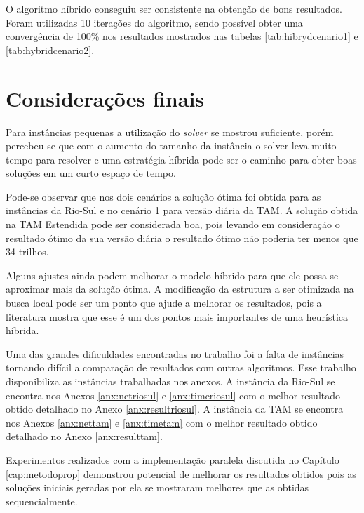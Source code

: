 O algoritmo híbrido conseguiu ser consistente na obtenção de bons resultados.
Foram utilizadas 10 iterações do algoritmo, sendo possível obter uma
convergência de 100\% nos resultados mostrados nas tabelas \ref{tab:hibrydcenario1} e
\ref{tab:hybridcenario2}. 

\section{Considerações finais} \label{result:finalizacao}





Para instâncias pequenas a utilização do \textit{solver} se mostrou suficiente,
porém percebeu-se que com o aumento do tamanho da instância o solver leva muito
tempo para resolver e uma estratégia híbrida pode ser o caminho para obter boas
soluções em um curto espaço de tempo.

Pode-se observar que nos dois cenários a solução ótima foi obtida para as
instâncias da Rio-Sul e no cenário 1 para versão diária da TAM. A solução obtida
na TAM Estendida pode ser considerada boa, pois levando em consideração o resultado
ótimo da sua versão diária o resultado ótimo não poderia ter menos que 34
trilhos.
  
Alguns ajustes ainda podem melhorar o modelo híbrido para que ele possa se
aproximar mais da solução ótima. A modificação da estrutura a ser otimizada na
busca local pode ser um ponto que ajude a melhorar os resultados, pois a
literatura mostra que esse é um dos pontos mais importantes de uma heurística
híbrida.
 
Uma das grandes dificuldades encontradas no trabalho foi a falta de instâncias
tornando difícil a comparação de resultados com outras algoritmos. Esse trabalho
disponibiliza as instâncias trabalhadas nos anexos. A instância da Rio-Sul se
encontra nos Anexos \ref{anx:netriosul} e \ref{anx:timeriosul} com o melhor
resultado obtido detalhado no Anexo \ref{anx:resultriosul}. A instância da TAM
se encontra nos Anexos \ref{anx:nettam} e \ref{anx:timetam} com o melhor
resultado obtido detalhado no Anexo \ref{anx:resulttam}. 
 
Experimentos realizados com a implementação paralela discutida no Capítulo
\ref{cap:metodoprop} demonstrou potencial de melhorar os resultados obtidos pois
as soluções iniciais geradas por ela se mostraram melhores que as obtidas
sequencialmente.
 


